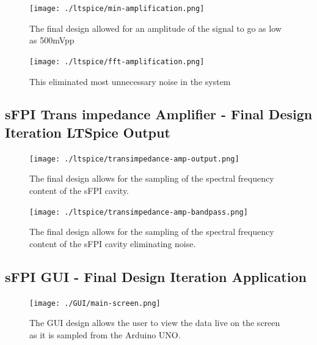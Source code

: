 \documentclass[12pt,journal]{IEEEtran}
\begin{document}
\begin{appendices}
\begin{figure}[h!]
	\centering
	\texttt{[image: ./ltspice/min-amplification.png]}
	\caption{The final design allowed for an amplitude of the signal to go as low as 500mVpp}
	\label{fig:min-amp-final-iteration}
\end{figure}
\newpage

\begin{figure}[h!]
	\centering
	\texttt{[image: ./ltspice/fft-amplification.png]}
	\caption{This eliminated most unnecessary noise in the system}
	\label{fig:fft-final-iteration}
\end{figure}
\newpage

\subsection{sFPI Trans impedance Amplifier - Final Design Iteration LTSpice Output} \label{subss:trans-amp-output}

\begin{figure}[h!]
	\centering
	\texttt{[image: ./ltspice/transimpedance-amp-output.png]}
	\caption{The final design allows for the sampling of the spectral frequency content of the sFPI cavity.}
	\label{fig:trans-amp-output}
\end{figure}
\newpage

\begin{figure}[h!]
	\centering
	\texttt{[image: ./ltspice/transimpedance-amp-bandpass.png]}
	\caption{The final design allows for the sampling of the spectral frequency content of the sFPI cavity eliminating noise.}
	\label{fig:trans-amp-fft}
\end{figure}
\newpage

\subsection{sFPI GUI - Final Design Iteration Application} \label{subss:GUI}

\begin{figure}[h!]
	\centering
	\texttt{[image: ./GUI/main-screen.png]}
	\caption{The GUI design allows the user to view the data live on the screen as it is sampled from the Arduino UNO.}
	\label{fig:GUI-main-screen}
\end{figure}
\newpage


\end{appendices}
\end{document}
